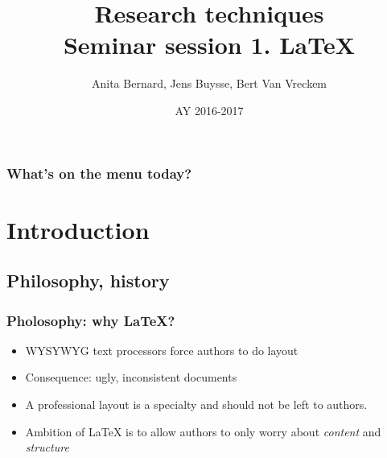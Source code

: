 \documentclass{beamer}
\title[Intro]{Research techniques\\Seminar session 1. \LaTeX{}}
\author{Anita Bernard, Jens Buysse, Bert {Van Vreckem}}
\date{AY 2016-2017}
\begin{document}

\HoGentLogo

\titleframe


\begin{frame}
  \frametitle{What's on the menu today?}

  \tableofcontents
\end{frame}

\section{Introduction}

\subsection{Philosophy, history}

\begin{frame}
  \frametitle{Pholosophy: why {\LaTeX}?}
  
  \begin{itemize}
  \item<+-> WYSYWYG text processors force authors to do layout
  \item<+-> Consequence: ugly, inconsistent documents
  \item<+-> A professional layout is a specialty and should not be left to authors.
  \item<+-> Ambition of {\LaTeX} is to allow authors to only worry about \emph{content} and \emph{structure}
  \end{itemize}
\end{frame}
\end{document}
